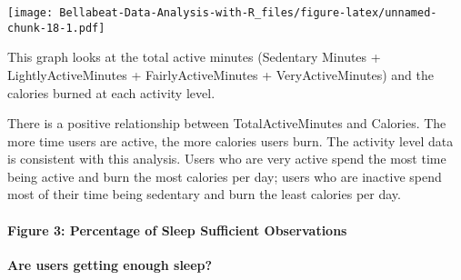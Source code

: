 \documentclass[
]{article}
\begin{document}
\texttt{[image: Bellabeat-Data-Analysis-with-R\_files/figure-latex/unnamed-chunk-18-1.pdf]}

This graph looks at the total active minutes (Sedentary Minutes +
LightlyActiveMinutes + FairlyActiveMinutes + VeryActiveMinutes) and the
calories burned at each activity level.

There is a positive relationship between TotalActiveMinutes and
Calories. The more time users are active, the more calories users burn.
The activity level data is consistent with this analysis. Users who are
very active spend the most time being active and burn the most calories
per day; users who are inactive spend most of their time being sedentary
and burn the least calories per day.

\hypertarget{figure-3-percentage-of-sleep-sufficient-observations}{%
\paragraph{Figure 3: Percentage of Sleep Sufficient
Observations}\label{figure-3-percentage-of-sleep-sufficient-observations}}

\textbf{Are users getting enough sleep?}
\end{document}
